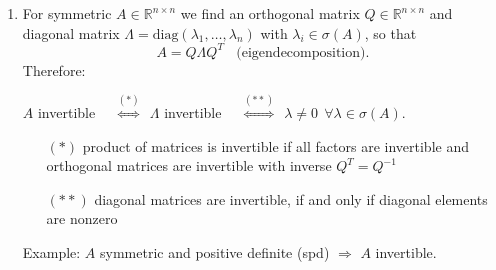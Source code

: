 {\begin{enumerate}
	\item 
	For symmetric $A\in\mathbb{R}^{n\times n}$ we find an orthogonal matrix $Q\in\mathbb{R}^{n\times n}$ and diagonal matrix $\Lambda = \text{diag}(\lambda_1,\ldots,\lambda_n)$ with $\lambda_i\in\sigma(A)$, so that   $$A=Q\Lambda Q^T ~~~~\text{(eigendecomposition)}.$$
	Therefore:
	\begin{center}
		$A$ invertible 
		~~$\stackrel{(*)}{\Leftrightarrow}\ \ \Lambda$ invertible 
		~~$\stackrel{(**)}{\Leftrightarrow}\ \ \lambda\neq 0\ \ \forall\lambda\in\sigma(A)$.
	\end{center}
	\begin{itemize}
		\item[$(*)$]  product of matrices is invertible if all factors are invertible and orthogonal matrices are invertible with inverse $Q^T=Q^{-1}$
		\item[$(**)$] diagonal matrices are invertible, if and only if diagonal elements are nonzero
	\end{itemize}
Example: $A$ symmetric and positive definite (spd) $\Rightarrow$ $A$ invertible.
\end{enumerate}
}